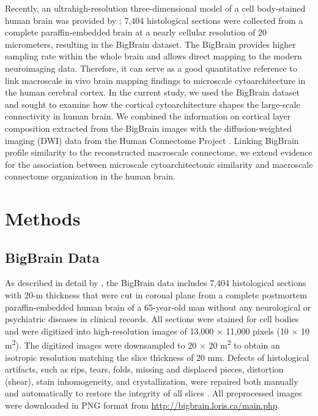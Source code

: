 \begin{refsection}
Recently, an ultrahigh-resolution three-dimensional model of a cell body-stained human brain was provided by \citet{amunts2013bigbrain}; 7,404 histological sections were collected from a complete paraffin-embedded brain at a nearly cellular resolution of 20 micrometers, resulting in the BigBrain dataset. The BigBrain provides higher sampling rate within the whole brain and allows direct mapping to the modern neuroimaging data. Therefore, it can serve as a good quantitative reference to link macroscale in vivo brain mapping findings to microscale cytoarchitecture in the human cerebral cortex. In the current study, we used the BigBrain dataset and sought to examine how the cortical cytoarchitecture shapes the large-scale connectivity in human brain. We combined the information on cortical layer composition extracted from the BigBrain images with the diffusion-weighted imaging (DWI) data from the Human Connectome Project \citep{VANESSEN201362}. Linking BigBrain profile similarity to the reconstructed macroscale connectome, we extend evidence for the association between microscale cytoarchitectonic similarity and macroscale connectome organization in the human brain.

\section*{Methods}
\subsection*{BigBrain Data}
As described in detail by \citet{amunts2013bigbrain}, the BigBrain data includes 7,404 histological sections with 20-{\textmu}m thickness that were cut in coronal plane from a complete postmortem paraffin-embedded human brain of a 65-year-old man without any neurological or psychiatric diseases in clinical records. All sections were stained for cell bodies \citep{MERKER1983235} and were digitized into high-resolution images of 13,000 $\times$ 11,000 pixels (10 $\times$ 10 {\textmu}m\textsuperscript{2}). The digitized images were downsampled to 20 $\times$ 20 {\textmu}m\textsuperscript{2} to obtain an isotropic resolution matching the slice thickness of 20 mm. Defects of histological artifacts, such as rips, tears, folds, missing and displaced pieces, distortion (shear), stain inhomogeneity, and crystallization, were repaired both manually and automatically to restore the integrity of all slices \citep{amunts2013bigbrain}. All preprocessed images were downloaded in PNG format from \url{http://bigbrain.loris.ca/main.php}.


\end{refsection}
